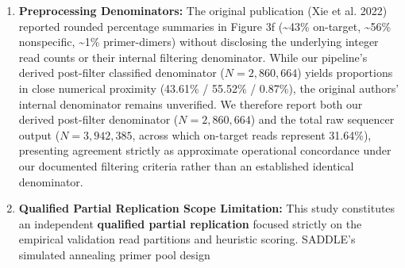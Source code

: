 \documentclass[
]{article}
\begin{document}
\begin{enumerate}
\begin{itemize}
    intended amplicon sequences using Bowtie2 in MATLAB. In our
    lightweight, turnkey Python implementation, Method 2 executes
    cognate-anchored semi-global gapped alignment (\texttt{edlib},
    Myers' bit-vector algorithm in prefix-matching \texttt{SHW} mode)
    where each cognate-primer read is aligned directly against its
    assigned target amplicon from MOESM5. A separate dual-strand
    all-target audit across an initial deterministic sample of 5,000
    classified reads (768 targets per read) confirmed 0 cross-target
    best matches among cognate reads (0/2,203 best-scoring alignments
    \(\ge 75\%\) were non-cognate; secondary sub-threshold alignments
    were not logged) and a minor 2.52\% target capture among non-cognate
    reads, establishing 97.48\% operational binary concordance across an
    exhaustive 2 \(\times\) 2 confusion matrix
    (\([2,193 + 2,681] / 5,000\)). Crucially, this concordance metric
    measures agreement specifically within this 5,000-read sample; it is
    not derived from a full-dataset confusion matrix, should not be
    extrapolated as proof of identical classification across all 3.94
    million reads, and does not establish mathematical equivalence to
    the original Bowtie2 amplicon mapping workflow.
  \end{itemize}
\item
  \textbf{Preprocessing Denominators:} The original publication (Xie et
  al. 2022) reported rounded percentage summaries in Figure 3f
  (\textasciitilde43\% on-target, \textasciitilde56\% nonspecific,
  \textasciitilde1\% primer-dimers) without disclosing the underlying
  integer read counts or their internal filtering denominator. While our
  pipeline's derived post-filter classified denominator
  (\(N = 2,860,664\)) yields proportions in close numerical proximity
  (43.61\% / 55.52\% / 0.87\%), the original authors' internal
  denominator remains unverified. We therefore report both our derived
  post-filter denominator (\(N = 2,860,664\)) and the total raw
  sequencer output (\(N = 3,942,385\), across which on-target reads
  represent 31.64\%), presenting agreement strictly as approximate
  operational concordance under our documented filtering criteria rather
  than an established identical denominator.
\item
  \textbf{Qualified Partial Replication Scope Limitation:} This study
  constitutes an independent \textbf{qualified partial replication}
  focused strictly on the empirical validation read partitions and
  heuristic scoring. SADDLE's simulated annealing primer pool design

\end{enumerate}
\end{document}
